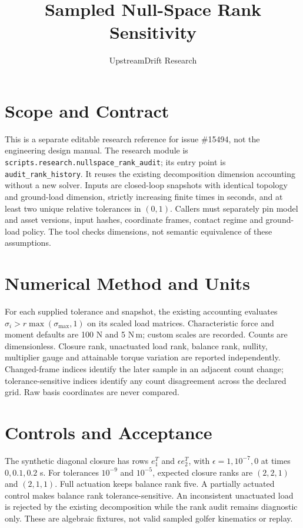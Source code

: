 \documentclass{article}
\title{Sampled Null-Space Rank Sensitivity}
\author{UpstreamDrift Research}
\begin{document}
\maketitle
\section{Scope and Contract}
This is a separate editable research reference for issue \#15494, not the
engineering design manual. The research module is
\texttt{scripts.research.nullspace\_rank\_audit}; its entry point is
\texttt{audit\_rank\_history}.
It reuses the existing decomposition dimension accounting without a new solver.
Inputs are closed-loop snapshots with identical topology and ground-load
dimension, strictly increasing finite times in seconds, and at least two unique
relative tolerances in $(0,1)$. Callers must separately pin model and asset
versions, input hashes, coordinate frames, contact regime and ground-load policy.
The tool checks dimensions, not semantic equivalence of these assumptions.

\section{Numerical Method and Units}
For each supplied tolerance and snapshot, the existing accounting evaluates
$\sigma_i > r\max(\sigma_{\max},1)$ on its scaled load matrices.
Characteristic force and moment defaults are 100 N and 5 N\,m; custom scales
are recorded. Counts are dimensionless. Closure rank, unactuated load rank,
balance rank, nullity, multiplier gauge and attainable torque variation are
reported independently. Changed-frame indices identify the later sample in
an adjacent count change; tolerance-sensitive indices identify any count
disagreement across the declared grid. Raw basis coordinates are never compared.

\section{Controls and Acceptance}
The synthetic diagonal closure has rows $e_1^T$ and $\epsilon e_2^T$, with
$\epsilon=1,10^{-7},0$ at times $0,0.1,0.2$ s. For tolerances $10^{-9}$ and
$10^{-5}$, expected closure ranks are $(2,2,1)$ and $(2,1,1)$.
Full actuation keeps balance rank five. A partially actuated control makes
balance rank tolerance-sensitive. An inconsistent unactuated load is rejected
by the existing decomposition while the rank audit remains diagnostic only.
These are algebraic fixtures, not valid sampled golfer kinematics or replay.
\end{document}
